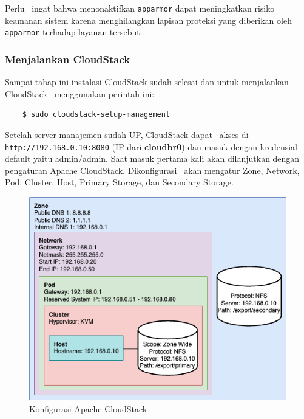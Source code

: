 Perlu \saya\ ingat bahwa menonaktifkan \texttt{apparmor} dapat meningkatkan risiko keamanan sistem karena menghilangkan lapisan proteksi yang diberikan oleh \texttt{apparmor} terhadap layanan tersebut.

\subsubsection{Menjalankan CloudStack}
Sampai tahap ini instalasi CloudStack sudah selesai dan untuk menjalankan CloudStack \saya\ menggunakan perintah ini:

\begin{listing}[H]
    \begin{verbatim}  
    $ sudo cloudstack-setup-management
    \end{verbatim}
\end{listing}

Setelah server manajemen sudah UP, CloudStack dapat \saya\ akses di \texttt{http://192.168.0.10:8080} (IP dari \textbf{cloudbr0}) dan masuk dengan kredensial default yaitu admin/admin. Saat masuk pertama kali akan dilanjutkan dengan pengaturan Apache CloudStack. Dikonfigurasi \saya\ akan mengatur Zone, Network, Pod, Cluster, Host, Primary Storage, dan Secondary Storage.

\begin{figure}
    \centering
    \includegraphics[width=1\textwidth]
    {assets/pics/cloudstack_config.png}
    \caption{Konfigurasi Apache CloudStack}
    \label{fig:KonfigurasiApacheCloudStack}
\end{figure}

